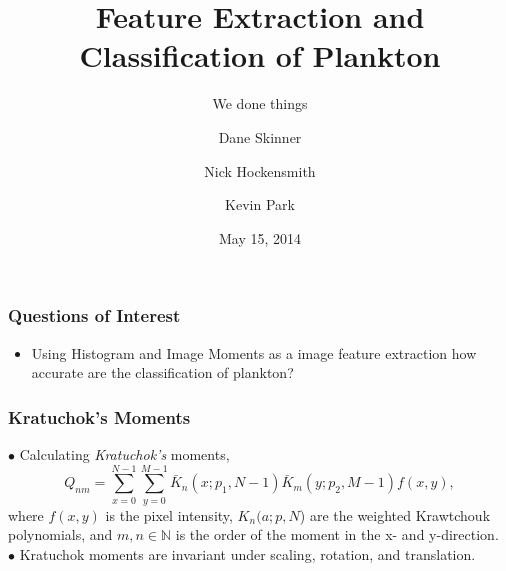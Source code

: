 \documentclass{beamer}
\title 
{Feature Extraction and Classification of Plankton}
\subtitle
{ We done things }
\author{Dane Skinner \and Nick Hockensmith \and Kevin Park}
\institute
{Oregon State University}
\date
{May 15, 2014}
\begin{document}
\begin{frame}
	\maketitle
\end{frame}


\begin{frame}
\frametitle{Questions of Interest}
\begin{itemize}
	\item Using Histogram and Image Moments as a image feature extraction how accurate are the classification of plankton?
\end{itemize}

\end{frame}


\begin{frame}
\frametitle{Kratuchok's Moments}
$\bullet$ Calculating \textit{Kratuchok's} moments,
\begin{equation*}
Q_{nm} = \sum_{x=0}^{N-1}\sum_{y=0}^{M-1}\bar{K}_n(x;p_1,N-1)\bar{K}_m(y;p_2,M-1)f(x,y),
\end{equation*}
where  $f(x,y)$ is the pixel intensity, $K_n(a;p,N$) are the weighted Krawtchouk polynomials, and $m,n\in \mathbb{N}$ is the order of the moment in the x- and y-direction.\\
$\bullet$ Kratuchok moments are invariant under scaling, rotation, and translation. \\
\end{frame}

\end{document}
